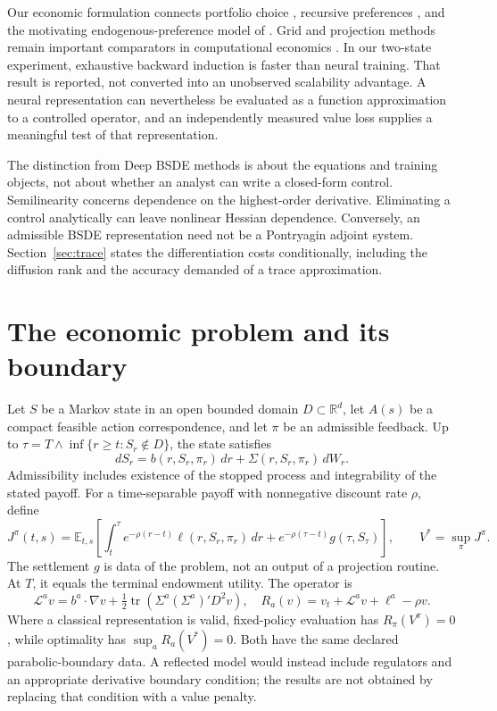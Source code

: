 Our economic formulation connects portfolio choice \citep{merton1969}, recursive preferences \citep{epstein1989,duffie1992}, and the motivating endogenous-preference model of \citet{qi2025}. Grid and projection methods remain important comparators in computational economics \citep{judd1998,brumm2017}. In our two-state experiment, exhaustive backward induction is faster than neural training. That result is reported, not converted into an unobserved scalability advantage. A neural representation can nevertheless be evaluated as a function approximation to a controlled operator, and an independently measured value loss supplies a meaningful test of that representation.

The distinction from Deep BSDE methods \citep{han2018} is about the equations and training objects, not about whether an analyst can write a closed-form control. Semilinearity concerns dependence on the highest-order derivative. Eliminating a control analytically can leave nonlinear Hessian dependence. Conversely, an admissible BSDE representation need not be a Pontryagin adjoint system. Section~\ref{sec:trace} states the differentiation costs conditionally, including the diffusion rank and the accuracy demanded of a trace approximation.

\section{The economic problem and its boundary}
\label{sec:problem}
Let $S$ be a Markov state in an open bounded domain $D\subset\mathbb R^d$, let $A(s)$ be a compact feasible action correspondence, and let $\pi$ be an admissible feedback. Up to $\tau=T\wedge\inf\{r\geq t:S_r\notin D\}$, the state satisfies
\begin{equation}
dS_r=b(r,S_r,\pi_r)\,dr+\Sigma(r,S_r,\pi_r)\,dW_r.
\label{eq:state}
\end{equation}
Admissibility includes existence of the stopped process and integrability of the stated payoff. For a time-separable payoff with nonnegative discount rate $\rho$, define
\begin{equation}
J^\pi(t,s)=\mathbb E_{t,s}\left[\int_t^\tau e^{-\rho(r-t)}\ell(r,S_r,\pi_r)\,dr
 +e^{-\rho(\tau-t)}g(\tau,S_\tau)\right],\qquad V^*=\sup_\pi J^\pi.
\label{eq:payoff}
\end{equation}
The settlement $g$ is data of the problem, not an output of a projection routine. At $T$, it equals the terminal endowment utility. The operator is
\[
\mathcal L^a v=b^a\cdot\nabla v+\tfrac12\operatorname{tr}(\Sigma^a(\Sigma^a)'D^2v),
\quad R_a(v)=v_t+\mathcal L^a v+\ell^a-\rho v.
\]
Where a classical representation is valid, fixed-policy evaluation has $R_\pi(V^\pi)=0$, while optimality has $\sup_a R_a(V^*)=0$. Both have the same declared parabolic-boundary data. A reflected model would instead include regulators and an appropriate derivative boundary condition; the results are not obtained by replacing that condition with a value penalty.

